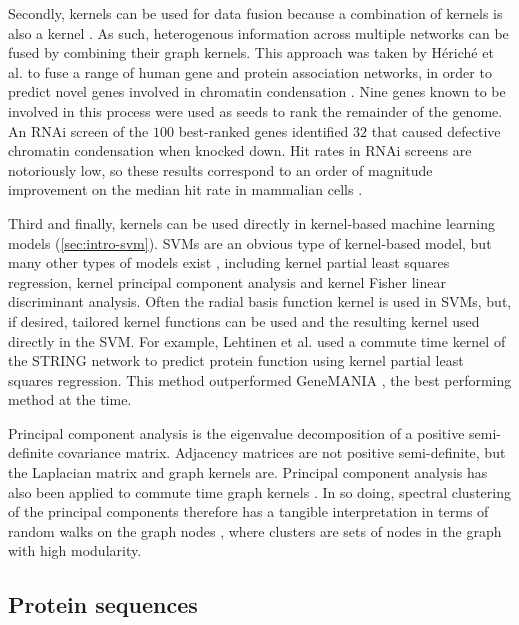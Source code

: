 Secondly, kernels can be used for data fusion because a combination of kernels is also a kernel \cite{Cristianini2004}. As such, heterogenous information across multiple networks can be fused by combining their graph kernels. This approach was taken by Hériché et al. to fuse a range of human gene and protein association networks, in order to predict novel genes involved in chromatin condensation \cite{Heriche2014}. Nine genes known to be involved in this process were used as seeds to rank the remainder of the genome. An RNAi screen of the $100$ best-ranked genes identified $32$ that caused defective chromatin condensation when knocked down. Hit rates in RNAi screens are notoriously low, so these results correspond to an order of magnitude improvement on the median hit rate in mammalian cells \cite{Sigoillot2011}.

Third and finally, kernels can be used directly in kernel-based machine learning models (\ref{sec:intro-svm}). SVMs are an obvious type of kernel-based model, but many other types of models exist \cite{Cristianini2004}, including kernel partial least squares regression, kernel principal component analysis and kernel Fisher linear discriminant analysis. Often the radial basis function kernel is used in SVMs, but, if desired, tailored kernel functions can be used and the resulting kernel used directly in the SVM. For example, Lehtinen et al. \cite{Lehtinen2015} used a commute time kernel of the STRING \cite{VonMering2005a} network to predict protein function using kernel partial least squares regression. This method outperformed GeneMANIA \cite{Mostafavi2008}, the best performing method at the time.

Principal component analysis is the eigenvalue decomposition of a positive semi-definite covariance matrix. Adjacency matrices are not positive semi-definite, but the Laplacian matrix and graph kernels are. Principal component analysis has also been applied to commute time graph kernels \cite{Saerens2004}. In so doing, spectral clustering \cite{Bach2004} of the principal components therefore has a tangible interpretation in terms of random walks on the graph nodes \cite{Saerens2004}, where clusters are sets of nodes in the graph with high modularity.

\subsection{Protein sequences}

